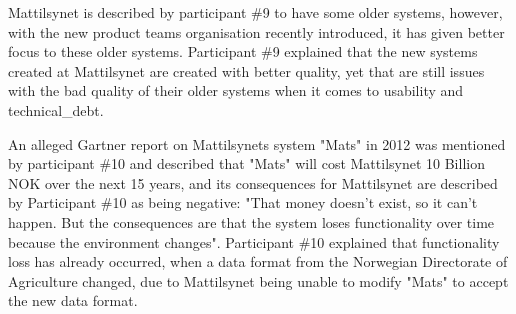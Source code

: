 
Mattilsynet is described by participant \#9 to have some older systems, however, with the new product teams organisation recently introduced, it has given better focus to these older systems. Participant \#9 explained that the new systems created at Mattilsynet are created with better quality, yet that are still issues with the bad quality of their older systems when it comes to usability and \gls{technical_debt}.



An alleged Gartner report on Mattilsynets system "Mats" in 2012 was mentioned by participant \#10 and described that "Mats" will cost Mattilsynet 10 Billion NOK over the next 15 years, and its consequences for Mattilsynet are described by Participant \#10 as being negative: "That money doesn't exist, so it can't happen. But the consequences are that the system loses functionality over time because the environment changes". Participant \#10 explained that functionality loss has already occurred, when a data format from the Norwegian Directorate of Agriculture changed, due to Mattilsynet being unable to modify "Mats" to accept the new data format.


